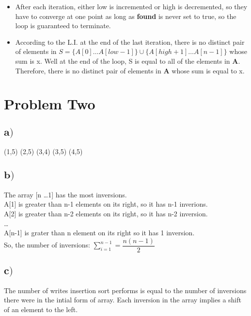 \documentclass[a4paper,12pt]{article}
\begin{document}
\begin{indentpar}{1cm}
  \begin{itemize}
    \item After each iteration, either low is incremented or high is decremented, so they have to converge at one
      point as long as {\bf found} is never set to true, so the loop is guaranteed to terminate.
    \item According to the L.I. at the end of the last iteration, there is no distinct pair of elements in 
      \(S = \{A[0] \dots A[low-1] \} \cup \{A[high+1] \dots A[n-1]\}\) whose sum is x. Well at the end of the loop,
      S is equal to all of the elements in {\bf A}. Therefore, there is no distinct pair of elements in {\bf A} whose
      sum is equal to x.
  \end{itemize}
\end{indentpar}

\section{Problem Two}
\subsection*{\(\mathbf a)\)}
(1,5) (2,5) (3,4) (3,5) (4,5)
\subsection*{\(\mathbf b)\)}
The array [n \dots 1] has the most inversions.\\
A[1] is greater than n-1 elements on its right, so it has n-1 inverions.\\
A[2] is greater than n-2 elements on its right, so it has n-2 inversion.\\
\dots\\
A[n-1] is grater than n element on its right so it has 1 inversion.\\
So, the number of inversions: \(\sum_{i=1}^{n-1} = \dfrac{n(n-1)}{2} \) 
\subsection*{\(\mathbf c)\)}
The number of writes insertion sort performs is equal to the number of inversions there were in the intial
form of array. Each inversion in the array implies a shift of an element to the left.
\end{document}
